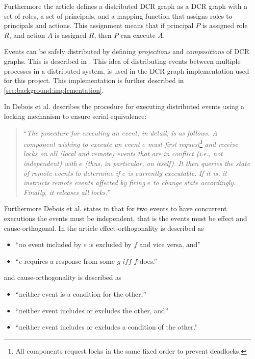 	Furthermore the article defines a distributed DCR graph as a DCR graph with a set of roles, a set of principals, and a mapping function that assigns roles to principals and actions. This assignment means that if principal $P$ is assigned role $R$, and action $A$ is assigned $R$, then $P$ can execute $A$.
		
	\newpar
	Events can be safely distributed by defining \textit{projections} and \textit{compositions} of DCR graphs. This is described in \cite{hildebrandt2011safe}. This idea of distributing events between multiple processes in a distributed system, is used in the DCR graph implementation used for this project. This implementation is further described in \autoref{sec:background:implementation}. 
    
	\newpar 
	In \cite{debois2015concurrency} Debois et al. describes the procedure for executing distributed events using a locking mechanism to ensure serial equivalence:
	
	\begin{quotation}
		``\textit{The procedure for executing an event, in detail, is as follows. A component
		wishing to execute an event $e$ must first request\footnote{All components request locks in the same fixed order to prevent deadlocks.} and receive locks on all (local
		and remote) events that are in conflict (i.e., not independent) with $e$ (thus, in
		particular, on itself). It then queries the state of remote events to determine if
		$e$ is currently executable. If it is, it instructs remote events affected by firing $e$
		to change state accordingly. Finally, it releases all locks.}''
	\end{quotation}
	
	 \noindent Furthermore Debois et al. states in \cite{debois2015concurrency} that for two events to have concurrent executions the events must be independent, that is the events must be effect and cause-orthogonal. In the article effect-orthogonality is described as
	\begin{itemize}
		\item ``no event included by $e$ is excluded by $f$ and vice versa, and''
		\item ``$e$ requires a response from some $g$ $iff$ $f$ does.''
	\end{itemize}
	
	\noindent and cause-orthogonality is described as
	\begin{itemize}
		\item ``neither event is a condition for the other,''
		\item ``neither event includes or excludes the other, and''
		\item ``neither event includes or excludes a condition of the other.''
	\end{itemize}

